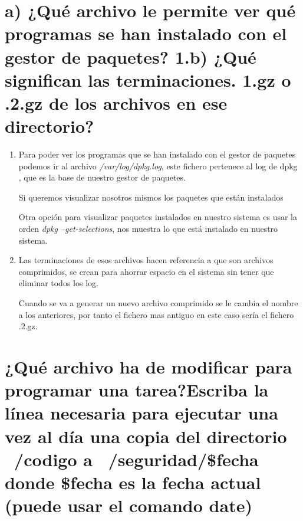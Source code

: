 \listoffigures

\listoftables

\newpage

\section[Cuestión 1]{a) ¿Qué archivo le permite ver qué programas se han instalado con el gestor de paquetes? 1.b) ¿Qué significan las terminaciones.	1.gz o .2.gz de los archivos en ese directorio?}

\begin{enumerate}[label=(\alph*)]
	
	\item Para poder ver los programas que se han instalado con el gestor de paquetes podemos ir al archivo \textit{/var/log/dpkg.log}, este fichero pertenece al log de dpkg \cite{dpkg}, que es la base de nuestro gestor de paquetes. 
	
	Si queremos visualizar nosotros mismos los paquetes que están instalados 
	
	Otra opción para visualizar paquetes instalados en nuestro sistema es usar la orden \textit{dpkg --get-selections}, nos muestra lo que está instalado en nuestro sistema.
	
	\item Las terminaciones de esos archivos hacen referencia a que son archivos comprimidos, se crean para ahorrar espacio en el sistema sin tener que eliminar todos los log.
	
	Cuando se va a generar un nuevo archivo comprimido se le cambia el nombre a los anteriores, por tanto el fichero mas antiguo en este caso sería el fichero .2.gz.
	
\end{enumerate}

\section[Cuestión 2]{¿Qué archivo ha de modificar para programar una tarea?Escriba la línea necesaria para ejecutar una vez al día una copia del directorio ~/codigo a ~/seguridad/\$fecha donde \$fecha es la fecha actual	(puede usar el comando date)}

